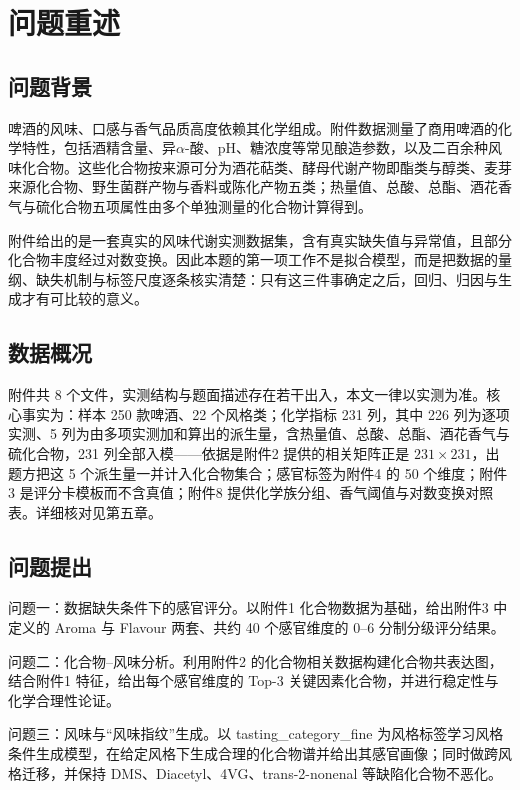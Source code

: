 \section{问题重述}

\subsection{问题背景}

啤酒的风味、口感与香气品质高度依赖其化学组成。附件数据测量了商用啤酒的化学特性，包括酒精含量、异$\alpha$-酸、pH、糖浓度等常见酿造参数，以及二百余种风味化合物。这些化合物按来源可分为酒花萜类、酵母代谢产物即酯类与醇类、麦芽来源化合物、野生菌群产物与香料或陈化产物五类；热量值、总酸、总酯、酒花香气与硫化合物五项属性由多个单独测量的化合物计算得到。

附件给出的是一套真实的风味代谢实测数据集，含有真实缺失值与异常值，且部分化合物丰度经过对数变换。因此本题的第一项工作不是拟合模型，而是把数据的量纲、缺失机制与标签尺度逐条核实清楚：只有这三件事确定之后，回归、归因与生成才有可比较的意义。

\subsection{数据概况}

附件共 8 个文件，实测结构与题面描述存在若干出入，本文一律以实测为准。核心事实为：样本 250 款啤酒、22 个风格类；化学指标 231 列，其中 226 列为逐项实测、5 列为由多项实测加和算出的派生量，含热量值、总酸、总酯、酒花香气与硫化合物，231 列全部入模——依据是附件2 提供的相关矩阵正是 $231\times231$，出题方把这 5 个派生量一并计入化合物集合；感官标签为附件4 的 50 个维度；附件3 是评分卡模板而不含真值；附件8 提供化学族分组、香气阈值与对数变换对照表。详细核对见第五章。

\subsection{问题提出}

问题一：数据缺失条件下的感官评分。以附件1 化合物数据为基础，给出附件3 中定义的 Aroma 与 Flavour 两套、共约 40 个感官维度的 0--6 分制分级评分结果。

问题二：化合物--风味分析。利用附件2 的化合物相关数据构建化合物共表达图，结合附件1 特征，给出每个感官维度的 Top-3 关键因素化合物，并进行稳定性与化学合理性论证。

问题三：风味与“风味指纹”生成。以 tasting\_category\_fine 为风格标签学习风格条件生成模型，在给定风格下生成合理的化合物谱并给出其感官画像；同时做跨风格迁移，并保持 DMS、Diacetyl、4VG、trans-2-nonenal 等缺陷化合物不恶化。
